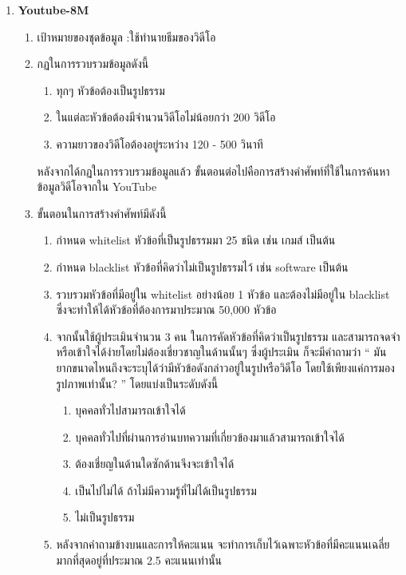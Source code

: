 \begin{enumerate}
	\item \textbf{Youtube-8M}
	\begin{enumerate}
		\setlength\itemsep{-0.25em}
		\item เป้าหมายของชุดข้อมูล :ใช้ทำนายธีมของวิดีโอ
		\item กฏในการรวบรวมข้อมูลดังนี้
		\begin{enumerate}
			\setlength\itemsep{-0.25em}
			\item ทุกๆ หัวข้อต้องเป็นรูปธรรม
			\item ในแต่ละหัวข้อต้องมีจำนวนวิดีโอไม่น้อยกว่า 200 วิดีโอ
			\item ความยาวของวิดีโอต้องอยู่ระหว่าง 120 - 500 วินาที
		\end{enumerate}
		หลังจากได้กฏในการรวบรวมข้อมูลแล้ว ขั้นตอนต่อไปคือการสร้างคำศัพท์ที่ใช้ในการค้นหาข้อมูลวิดีโอจากใน YouTube 
		\item ขั้นตอนในการสร้างคำศัพท์มีดังนี้
		\begin{enumerate}
			\setlength\itemsep{-0.25em}
			\item กำหนด whitelist หัวข้อที่เป็นรูปธรรมมา 25 ชนิด เช่น เกมส์ เป็นต้น
			\item กำหนด blacklist หัวข้อที่คิดว่าไม่เป็นรูปธรรมไว้ เช่น software เป็นต้น
			\item รวบรวมหัวข้อที่มีอยู่ใน whitelist อย่างน้อย 1 หัวข้อ และต้องไม่มีอยู่ใน blacklist ซึ่งจะทำให้ได้หัวข้อที่ต้องการมาประมาณ 50,000 หัวข้อ
			\item จากนั้นใช้ผู้ประเมินจำนวน 3 คน ในการคัดหัวข้อที่คิดว่าเป็นรูปธรรม และสามารถจดจำหรือเข้าใจได้ง่ายโดยไม่ต้องเชี่ยวชาญในด้านนั้นๆ ซึ่งผู้ประเมิน ก็จะมีคำถามว่า “ มันยากขนาดไหนถึงจะระบุได้ว่ามีหัวข้อดังกล่าวอยู่ในรูปหรือวิดีโอ โดยใช้เพียงแค่การมองรูปภาพเท่านั้น? ” โดยแบ่งเป็นระดับดังนี้
			\begin{enumerate}
				\setlength\itemsep{-0.25em}
				\item บุคคลทั่วไปสามารถเข้าใจได้
				\item บุคคลทั่วไปที่ผ่านการอ่านบทความที่เกี่ยวข้องมาแล้วสามารถเข้าใจได้
				\item ต้องเชี่ยญในด้านใดซักด้านจึงจะเข้าใจได้
				\item เป็นไปไม่ได้ ถ้าไม่มีความรู้ที่ไม่ได้เป็นรูปธรรม
				\item ไม่เป็นรูปธรรม
			\end{enumerate}
			\item หลังจากคำถามข้างบนและการให้คะแนน จะทำการเก็บไว้เฉพาะหัวข้อที่มีคะแนนเฉลี่ยมากที่สุดอยู่ที่ประมาณ 2.5 คะแนนเท่านั้น

\end{enumerate}
\end{enumerate}
\end{enumerate}
